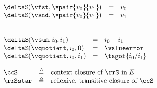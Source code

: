 \begin{flushleft}
\begin{mathpar}
\end{mathpar}

\medskip
\begin{minipage}[t]{0.5\textwidth}
\\
$\begin{array}{l c l}
  \deltaS(\vfst, \vpair{v_0}{v_1}) & = & v_0
\\
  \deltaS(\vsnd, \vpair{v_0}{v_1}) & = & v_1
\end{array}$
\end{minipage}%
\begin{minipage}[t]{0.5\textwidth}
\\
$\begin{array}{l c l}
  \deltaS(\vsum, i_0, i_1) & = & i_0 + i_1
\\
  \deltaS(\vquotient, i_0, 0) & = & \valueerror
\\
  \deltaS(\vquotient, i_0, i_1) & = & \tagof{i_0 / i_1}
\end{array}$
\end{minipage}

\medskip
{}
\begin{mathpar}


\end{mathpar}

\medskip
$\begin{array}{l c l}
  \ccS & \triangleq & \mbox{context closure of $\rrS$ in $E$}
\\
  \rrSstar & \triangleq & \mbox{reflexive, transitive closure of $\ccS$}
\end{array}$


\end{flushleft}
